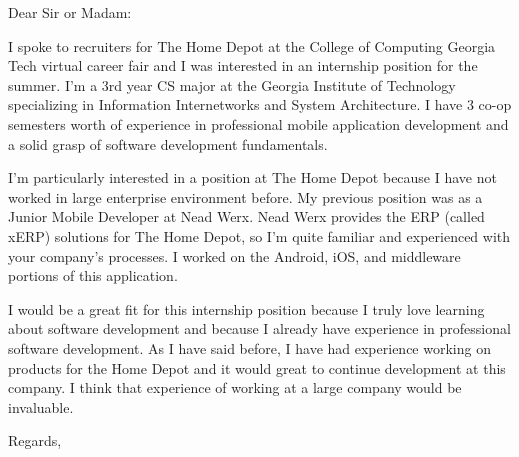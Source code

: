 \documentclass{letter}
\begin{document}
\begin{letter}{}
\opening{Dear Sir or Madam:}

I spoke to recruiters for The Home Depot at the College of Computing Georgia Tech virtual career fair and I was interested in an internship position for the summer. I'm a 3rd year CS major at the Georgia Institute of Technology specializing in Information Internetworks and System Architecture. I have 3 co-op semesters worth of experience in professional mobile application development and a solid grasp of software development fundamentals. 

I'm particularly interested in a position at The Home Depot because I have not worked in large enterprise environment before. My previous position was as a Junior Mobile Developer at Nead Werx. Nead Werx provides the ERP (called xERP) solutions for The Home Depot, so I'm quite familiar and experienced with your company's processes. I worked on the Android, iOS, and middleware portions of this application.

I would be a great fit for this internship position because I truly love learning about software development and because I already have experience in professional software development. As I have said before, I have had experience working on products for the Home Depot and it would great to continue development at this company. I think that experience of working at a large company would be invaluable.

\closing{Regards,}
\end{letter}
\end{document}
